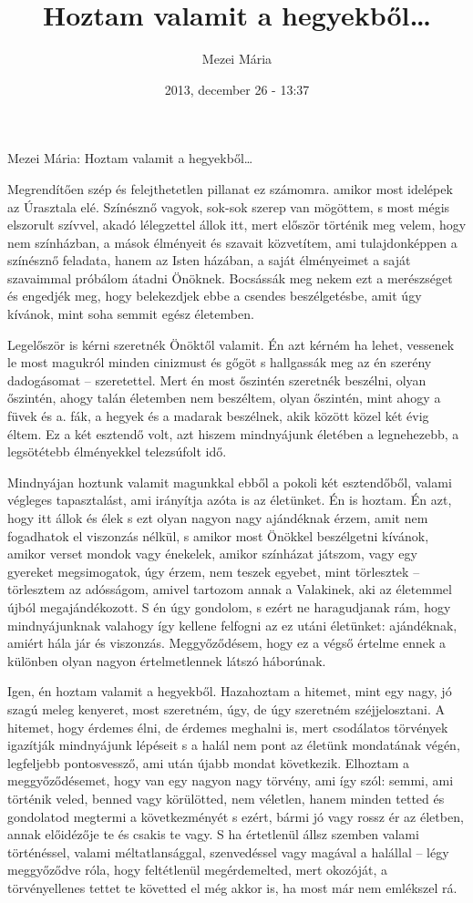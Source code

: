 \documentclass{IEEEtran}
\author{Mezei Mária}
\title{Hoztam valamit a hegyekből\dots}
\date{2013, december 26 - 13:37}
\begin{document}
Mezei Mária: Hoztam valamit a hegyekből\dots
\vspace{1cm}

Megrendítően szép és felejthetetlen pillanat ez számomra. amikor most idelépek
az Úrasztala elé. Színésznő vagyok, sok-sok szerep van mögöttem, s most mégis
elszorult szívvel, akadó lélegzettel állok itt, mert először történik meg
velem, hogy nem színházban,
a mások élményeit és szavait közvetítem, ami tulajdonképpen a színésznő
feladata, hanem az Isten házában, a saját élményeimet a saját szavaimmal
próbálom átadni Önöknek. Bocsássák meg nekem ezt a merészséget és engedjék
meg, hogy belekezdjek ebbe a csendes beszélgetésbe, amit úgy kívánok, mint
soha semmit egész életemben.

Legelőször is kérni szeretnék Önöktől valamit. Én azt kérném
ha lehet, vessenek le most magukról minden cinizmust és gőgöt s hallgassák meg
az én szerény dadogásomat – szeretettel. Mert én most őszintén szeretnék
beszélni, olyan őszintén, ahogy talán életemben nem beszéltem, olyan őszintén,
mint ahogy a füvek és a. fák, a hegyek és a madarak beszélnek, akik között
közel két évig éltem. Ez a két esztendő volt, azt hiszem mindnyájunk életében
a legnehezebb, a legsötétebb élményekkel telezsúfolt idő.

Mindnyájan hoztunk valamit magunkkal ebből a pokoli két esztendőből, valami
végleges tapasztalást, ami irányítja azóta is az életünket. Én is hoztam. Én
azt, hogy itt állok és élek s ezt olyan nagyon nagy ajándéknak érzem, amit nem
fogadhatok el viszonzás nélkül, s amikor most Önökkel beszélgetni kívánok,
amikor verset mondok vagy énekelek, amikor színházat játszom, vagy egy
gyereket megsimogatok, úgy érzem, nem teszek egyebet, mint törlesztek –
törlesztem az adósságom, amivel tartozom annak a Valakinek, aki az életemmel
újból megajándékozott. S én úgy gondolom, s ezért ne haragudjanak rám, hogy
mindnyájunknak valahogy így kellene felfogni az ez utáni életünket:
ajándéknak, amiért hála jár és viszonzás. Meggyőződésem, hogy ez a végső
értelme ennek a különben olyan nagyon értelmetlennek látszó háborúnak.

Igen, én hoztam valamit a hegyekből. Hazahoztam a hitemet, mint egy nagy, jó
szagú meleg kenyeret, most szeretném, úgy, de úgy szeretném széjjelosztani. A
hitemet, hogy érdemes élni, de érdemes meghalni is, mert csodálatos törvények
igazítják mindnyájunk lépéseit s a halál nem pont az életünk mondatának végén,
legfeljebb pontosvessző, ami után újabb mondat következik.
Elhoztam a meggyőződésemet, hogy van egy nagyon nagy törvény, ami így szól:
semmi, ami történik veled, benned vagy körülötted, nem véletlen, hanem minden
tetted és gondolatod megtermi a következményét s ezért, bármi jó vagy rossz ér
az életben, annak előidézője te és csakis te vagy. S ha értetlenül állsz
szemben valami történéssel, valami méltatlansággal, szenvedéssel vagy magával
a halállal – légy meggyőződve róla, hogy feltétlenül megérdemelted, mert
okozóját, a törvényellenes tettet te követted el még akkor is, ha most már nem
emlékszel rá.
\end{document}
